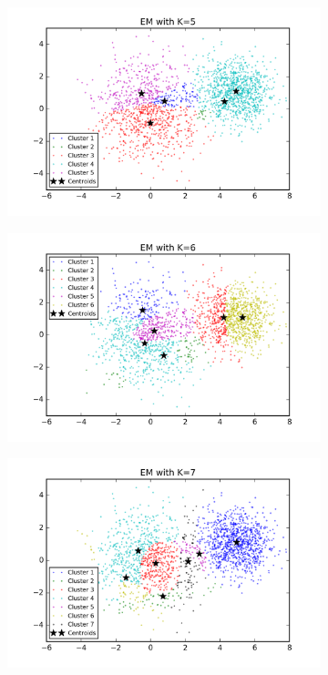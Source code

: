 \begin{figure}[htb]
\begin{subfigure}[b]{0.475\textwidth}
            \includegraphics[width=\textwidth]{./figures/clustering_EM_5.png}
        \end{subfigure}
        \hfill
        \begin{subfigure}[b]{0.475\textwidth}   
            \centering 
            \includegraphics[width=\textwidth]{./figures/clustering_EM_6.png}
        \end{subfigure}
        \begin{subfigure}[b]{0.475\textwidth}   
            \centering 
            \includegraphics[width=\textwidth]{./figures/clustering_EM_7.png}

\end{subfigure}
\end{figure}

